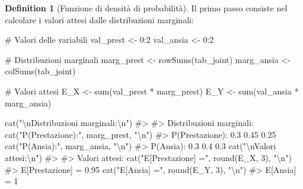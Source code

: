 \documentclass[
  letterpaper,
  DIV=11,
  numbers=noendperiod,
  oneside]{scrreprt}
\newenvironment{Shaded}{\begin{snugshade}}{\end{snugshade}}
\newcommand{\CommentTok}[1]{\textcolor[rgb]{0.37,0.37,0.37}{#1}}
\newcommand{\DecValTok}[1]{\textcolor[rgb]{0.68,0.00,0.00}{#1}}
\newcommand{\FunctionTok}[1]{\textcolor[rgb]{0.28,0.35,0.67}{#1}}
\newcommand{\NormalTok}[1]{\textcolor[rgb]{0.00,0.23,0.31}{#1}}
\newcommand{\OtherTok}[1]{\textcolor[rgb]{0.00,0.23,0.31}{#1}}
\newcommand{\SpecialCharTok}[1]{\textcolor[rgb]{0.37,0.37,0.37}{#1}}
\newcommand{\StringTok}[1]{\textcolor[rgb]{0.13,0.47,0.30}{#1}}
\theoremstyle{definition}
\theoremstyle{plain}
\theoremstyle{definition}
\newtheorem{definition}{Definition}[chapter]
\theoremstyle{remark}
\begin{document}
\begin{definition}[Funzione di densità di
probabilità]
Il primo passo consiste nel calcolare i valori attesi dalle
distribuzioni marginali:

\begin{Shaded}
\begin{Highlighting}[]
\CommentTok{\# Valori delle variabili}
\NormalTok{val\_prest }\OtherTok{\textless{}{-}} \DecValTok{0}\SpecialCharTok{:}\DecValTok{2}
\NormalTok{val\_ansia }\OtherTok{\textless{}{-}} \DecValTok{0}\SpecialCharTok{:}\DecValTok{2}

\CommentTok{\# Distribuzioni marginali}
\NormalTok{marg\_prest }\OtherTok{\textless{}{-}} \FunctionTok{rowSums}\NormalTok{(tab\_joint)}
\NormalTok{marg\_ansia }\OtherTok{\textless{}{-}} \FunctionTok{colSums}\NormalTok{(tab\_joint)}

\CommentTok{\# Valori attesi}
\NormalTok{E\_X }\OtherTok{\textless{}{-}} \FunctionTok{sum}\NormalTok{(val\_prest }\SpecialCharTok{*}\NormalTok{ marg\_prest)}
\NormalTok{E\_Y }\OtherTok{\textless{}{-}} \FunctionTok{sum}\NormalTok{(val\_ansia }\SpecialCharTok{*}\NormalTok{ marg\_ansia)}

\FunctionTok{cat}\NormalTok{(}\StringTok{"}\SpecialCharTok{\textbackslash{}n}\StringTok{Distribuzioni marginali:}\SpecialCharTok{\textbackslash{}n}\StringTok{"}\NormalTok{)}
\CommentTok{\#\textgreater{} }
\CommentTok{\#\textgreater{} Distribuzioni marginali:}
\FunctionTok{cat}\NormalTok{(}\StringTok{"P(Prestazione):"}\NormalTok{, marg\_prest, }\StringTok{"}\SpecialCharTok{\textbackslash{}n}\StringTok{"}\NormalTok{)}
\CommentTok{\#\textgreater{} P(Prestazione): 0.3 0.45 0.25}
\FunctionTok{cat}\NormalTok{(}\StringTok{"P(Ansia):"}\NormalTok{, marg\_ansia, }\StringTok{"}\SpecialCharTok{\textbackslash{}n}\StringTok{"}\NormalTok{)}
\CommentTok{\#\textgreater{} P(Ansia): 0.3 0.4 0.3}
\FunctionTok{cat}\NormalTok{(}\StringTok{"}\SpecialCharTok{\textbackslash{}n}\StringTok{Valori attesi:}\SpecialCharTok{\textbackslash{}n}\StringTok{"}\NormalTok{)}
\CommentTok{\#\textgreater{} }
\CommentTok{\#\textgreater{} Valori attesi:}
\FunctionTok{cat}\NormalTok{(}\StringTok{"E[Prestazione] ="}\NormalTok{, }\FunctionTok{round}\NormalTok{(E\_X, }\DecValTok{3}\NormalTok{), }\StringTok{"}\SpecialCharTok{\textbackslash{}n}\StringTok{"}\NormalTok{)}
\CommentTok{\#\textgreater{} E[Prestazione] = 0.95}
\FunctionTok{cat}\NormalTok{(}\StringTok{"E[Ansia] ="}\NormalTok{, }\FunctionTok{round}\NormalTok{(E\_Y, }\DecValTok{3}\NormalTok{), }\StringTok{"}\SpecialCharTok{\textbackslash{}n}\StringTok{"}\NormalTok{)}
\CommentTok{\#\textgreater{} E[Ansia] = 1}
\end{Highlighting}
\end{Shaded}


\end{definition}
\end{document}

